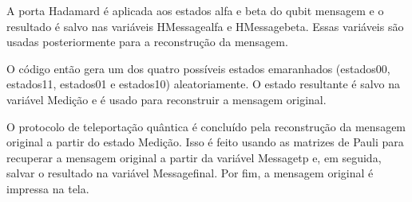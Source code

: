 A porta Hadamard é aplicada aos estados alfa e beta do qubit mensagem e o resultado é salvo nas variáveis HMessagealfa e HMessagebeta. Essas variáveis são usadas posteriormente para a reconstrução da mensagem.

O código então gera um dos quatro possíveis estados emaranhados (estados00, estados11, estados01 e estados10) aleatoriamente. O estado resultante é salvo na variável Medição e é usado para reconstruir a mensagem original.

O protocolo de teleportação quântica é concluído pela reconstrução da mensagem original a partir do estado Medição. Isso é feito usando as matrizes de Pauli para recuperar a mensagem original a partir da variável Messagetp e, em seguida, salvar o resultado na variável Messagefinal. Por fim, a mensagem original é impressa na tela.
